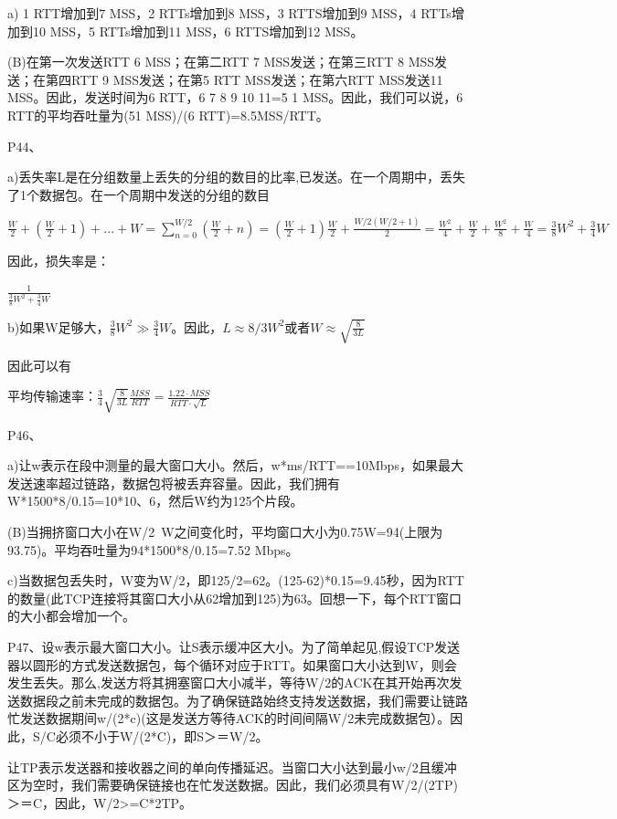 \documentclass[11pt,UTF8,twoside]{article}
\begin{document}
	a) 1 RTT增加到7 MSS，2 RTTs增加到8 MSS，3 RTTS增加到9 MSS，4 RTTs增加到10 MSS，5 RTTs增加到11 MSS，6 RTTS增加到12 MSS。
	
	(B)在第一次发送RTT 6 MSS；在第二RTT 7 MSS发送；在第三RTT 8 MSS发送；在第四RTT 9 MSS发送；在第5 RTT MSS发送；在第六RTT MSS发送11 MSS。因此，发送时间为6 RTT，6 7 8 9 10 11=5 1 MSS。因此，我们可以说，6 RTT的平均吞吐量为(51 MSS)/(6 RTT)=8.5MSS/RTT。
	
	P44、
	
	a)丢失率L是在分组数量上丢失的分组的数目的比率,已发送。在一个周期中，丢失了1个数据包。在一个周期中发送的分组的数目
	
	$\frac{W}{2}+\left ( \frac{W}{2} +1\right )+...+W=\sum_{n=0}^{W/2}(\frac{W}{2}+n)=\left ( \frac{W}{2}+1 \right )\frac{W}{2}+\frac{W/2(W/2+1)}{2}=\frac{W^2}{4}+\frac{W}{2}+\frac{W^2}{8}+\frac{W}{4}=\frac{3}{8}W^2+\frac{3}{4}W$
	
	因此，损失率是：
	
	$\frac{1}{\frac{3}{8}W^2+\frac{3}{4}W}$
	
	b)如果W足够大，$\frac{3}{8}W^2\gg \frac{3}{4}W$。因此，$L\approx 8/3W^2$或者$W\approx \sqrt{\frac{8}{3L}}$
	
	因此可以有
	
	平均传输速率：$\frac{3}{4}\sqrt{\frac{8}{3L}}\frac{MSS}{RTT}=\frac{1.22 \cdot MSS}{RTT\cdot\sqrt{L}}$
	
	P46、
	
	a)让w表示在段中测量的最大窗口大小。然后，w*ms/RTT==10Mbps，如果最大发送速率超过链路，数据包将被丢弃容量。因此，我们拥有W*1500*8/0.15=10*10、6，然后W约为125个片段。
	
	(B)当拥挤窗口大小在W/2~W之间变化时，平均窗口大小为0.75W=94(上限为93.75)。平均吞吐量为94*1500*8/0.15=7.52 Mbps。
	
	c)当数据包丢失时，W变为W/2，即125/2=62。(125-62)*0.15=9.45秒，因为RTT的数量(此TCP连接将其窗口大小从62增加到125)为63。回想一下，每个RTT窗口的大小都会增加一个。
	
	P47、设w表示最大窗口大小。让S表示缓冲区大小。为了简单起见,假设TCP发送器以圆形的方式发送数据包，每个循环对应于RTT。如果窗口大小达到W，则会发生丢失。那么,发送方将其拥塞窗口大小减半，等待W/2的ACK在其开始再次发送数据段之前未完成的数据包。为了确保链路始终支持发送数据，我们需要让链路忙发送数据期间w/(2*c)(这是发送方等待ACK的时间间隔W/2未完成数据包）。因此，S/C必须不小于W/(2*C)，即S＞＝W/2。
	
	让TP表示发送器和接收器之间的单向传播延迟。当窗口大小达到最小w/2且缓冲区为空时，我们需要确保链接也在忙发送数据。因此，我们必须具有W/2/(2TP)＞＝C，因此，W/2>=C*2TP。
	
\end{document}
